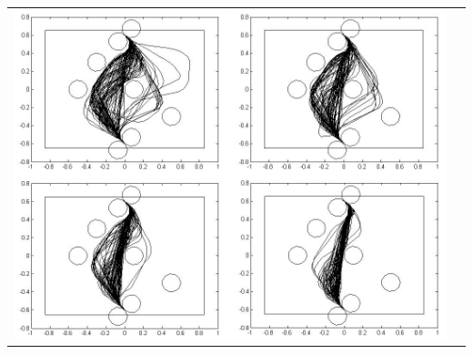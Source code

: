\documentclass[a4paper,12pt]{article}
\begin{document}
\begin{tabular}{p{5cm} p{7cm}}
    \vspace{0pt} 
    \label{fig: rrtsim}
	\includegraphics[width=1\textwidth]{figures/allsim.png}
    \vspace{0pt}\\
\end{tabular}




\end{document}
